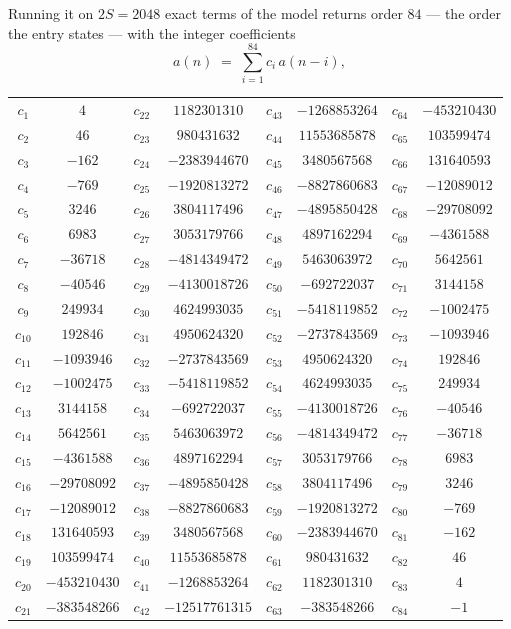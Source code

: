 \documentclass[11pt,a4paper]{article}
\theoremstyle{plain}
\theoremstyle{definition}
\begin{document}
Running it on $2S=2048$ exact terms of the model returns order $84$ --- the order the
entry states --- with the integer coefficients
\[
a(n)\;=\;\sum_{i=1}^{84}c_i\,a(n-i),
\]
\begin{center}\small
\begin{tabular}{cccccccc}
$c_{1}$ & $4$ & $c_{22}$ & $1182301310$ & $c_{43}$ & $-1268853264$ & $c_{64}$ & $-453210430$ \\
$c_{2}$ & $46$ & $c_{23}$ & $980431632$ & $c_{44}$ & $11553685878$ & $c_{65}$ & $103599474$ \\
$c_{3}$ & $-162$ & $c_{24}$ & $-2383944670$ & $c_{45}$ & $3480567568$ & $c_{66}$ & $131640593$ \\
$c_{4}$ & $-769$ & $c_{25}$ & $-1920813272$ & $c_{46}$ & $-8827860683$ & $c_{67}$ & $-12089012$ \\
$c_{5}$ & $3246$ & $c_{26}$ & $3804117496$ & $c_{47}$ & $-4895850428$ & $c_{68}$ & $-29708092$ \\
$c_{6}$ & $6983$ & $c_{27}$ & $3053179766$ & $c_{48}$ & $4897162294$ & $c_{69}$ & $-4361588$ \\
$c_{7}$ & $-36718$ & $c_{28}$ & $-4814349472$ & $c_{49}$ & $5463063972$ & $c_{70}$ & $5642561$ \\
$c_{8}$ & $-40546$ & $c_{29}$ & $-4130018726$ & $c_{50}$ & $-692722037$ & $c_{71}$ & $3144158$ \\
$c_{9}$ & $249934$ & $c_{30}$ & $4624993035$ & $c_{51}$ & $-5418119852$ & $c_{72}$ & $-1002475$ \\
$c_{10}$ & $192846$ & $c_{31}$ & $4950624320$ & $c_{52}$ & $-2737843569$ & $c_{73}$ & $-1093946$ \\
$c_{11}$ & $-1093946$ & $c_{32}$ & $-2737843569$ & $c_{53}$ & $4950624320$ & $c_{74}$ & $192846$ \\
$c_{12}$ & $-1002475$ & $c_{33}$ & $-5418119852$ & $c_{54}$ & $4624993035$ & $c_{75}$ & $249934$ \\
$c_{13}$ & $3144158$ & $c_{34}$ & $-692722037$ & $c_{55}$ & $-4130018726$ & $c_{76}$ & $-40546$ \\
$c_{14}$ & $5642561$ & $c_{35}$ & $5463063972$ & $c_{56}$ & $-4814349472$ & $c_{77}$ & $-36718$ \\
$c_{15}$ & $-4361588$ & $c_{36}$ & $4897162294$ & $c_{57}$ & $3053179766$ & $c_{78}$ & $6983$ \\
$c_{16}$ & $-29708092$ & $c_{37}$ & $-4895850428$ & $c_{58}$ & $3804117496$ & $c_{79}$ & $3246$ \\
$c_{17}$ & $-12089012$ & $c_{38}$ & $-8827860683$ & $c_{59}$ & $-1920813272$ & $c_{80}$ & $-769$ \\
$c_{18}$ & $131640593$ & $c_{39}$ & $3480567568$ & $c_{60}$ & $-2383944670$ & $c_{81}$ & $-162$ \\
$c_{19}$ & $103599474$ & $c_{40}$ & $11553685878$ & $c_{61}$ & $980431632$ & $c_{82}$ & $46$ \\
$c_{20}$ & $-453210430$ & $c_{41}$ & $-1268853264$ & $c_{62}$ & $1182301310$ & $c_{83}$ & $4$ \\
$c_{21}$ & $-383548266$ & $c_{42}$ & $-12517761315$ & $c_{63}$ & $-383548266$ & $c_{84}$ & $-1$ \\
\end{tabular}
\end{center}
\end{document}
